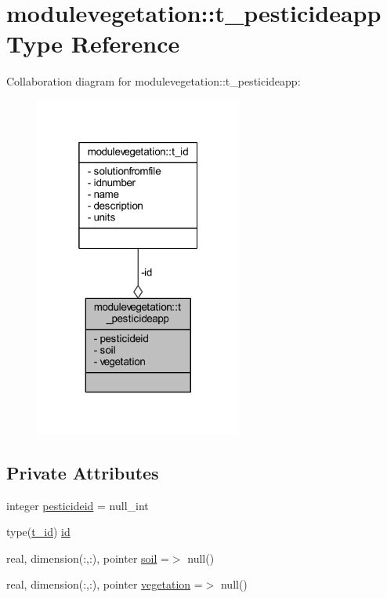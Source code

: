 \hypertarget{structmodulevegetation_1_1t__pesticideapp}{}\section{modulevegetation\+:\+:t\+\_\+pesticideapp Type Reference}
\label{structmodulevegetation_1_1t__pesticideapp}


Collaboration diagram for modulevegetation\+:\+:t\+\_\+pesticideapp\+:\nopagebreak
\begin{figure}[H]
\begin{center}
\leavevmode
\includegraphics[width=193pt]{structmodulevegetation_1_1t__pesticideapp__coll__graph}
\end{center}
\end{figure}
\subsection*{Private Attributes}
\begin{DoxyCompactItemize}
\item 
integer \mbox{\hyperlink{structmodulevegetation_1_1t__pesticideapp_a154c6734d09edfa2aa076888ff071452}{pesticideid}} = null\+\_\+int
\item 
type(\mbox{\hyperlink{structmodulevegetation_1_1t__id}{t\+\_\+id}}) \mbox{\hyperlink{structmodulevegetation_1_1t__pesticideapp_a1dede6bc474e632a2d8da022f89c13bd}{id}}
\item 
real, dimension(\+:,\+:), pointer \mbox{\hyperlink{structmodulevegetation_1_1t__pesticideapp_ac809129b38890683fb984de830072a41}{soil}} =$>$ null()
\item 
real, dimension(\+:,\+:), pointer \mbox{\hyperlink{structmodulevegetation_1_1t__pesticideapp_afa67ac536196a959216f348cef8826fe}{vegetation}} =$>$ null()
\end{DoxyCompactItemize}


